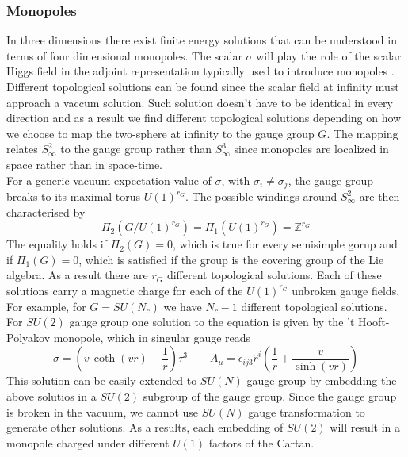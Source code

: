 \subsubsection{Monopoles}
In three dimensions there exist finite energy solutions that can be understood in terms of four dimensional monopoles.
The scalar $\sigma$ will play the role of the scalar Higgs field in the adjoint representation typically used to introduce monopoles \cite{Weinberg:2006rq}.
Different topological solutions can be found since the scalar field at infinity must approach a vaccum solution.
Such solution doesn't have to be identical in every direction and as a result we find different topological solutions depending on how we choose to map the two-sphere at infinity to the gauge group $G$.
The mapping relates $S^2_{\infty}$ to the gauge group rather than $S^3_{\infty}$ since monopoles are localized in space rather than in space-time.\\
For a generic vacuum expectation value of $\sigma$, with $\sigma_i \neq \sigma_j$, the gauge group breaks to its maximal torus $U(1)^{r_G}$.
The possible windings around $S^2_{\infty}$ are then characterised by
\begin{equation}
 \Pi_{2} \left( G / U(1)^{r_G} \right) = \Pi_1 (U(1)^{r_G}) = \mathbb{Z}^{r_G}
\end{equation}
The equality holds if $\Pi_2(G) = 0$, which is true for every semisimple gorup and if $\Pi_1(G) = 0$, which is satisfied if the group is the covering group of the Lie algebra.
As a result there are $r_G$ different topological solutions.
Each of these solutions carry a magnetic charge for each of the $U(1)^{r_G}$ unbroken gauge fields. 
For example, for $G= SU(N_c)$ we have $N_c-1$ different topological solutions.
\\
For $SU(2)$ gauge group one solution to the equation is given by the 't Hooft-Polyakov monopole, which in singular gauge reads
\begin{equation}
  \sigma = \left( v \, \coth (v r) - \frac{1}{r} \right)  \tau^3 \qquad A_{\mu} = \epsilon_{i j 3} \hat{r}^i \left( \frac{1}{r} + \frac{v}{\sinh (vr)} \right)
\end{equation}
This solution can be easily extended to $SU(N)$ gauge group by embedding the above solutios in a $SU(2)$ subgroup of the gauge group.
Since the gauge group is broken in the vacuum, we cannot use $SU(N)$ gauge transformation to generate other solutions.
As a results, each embedding of $SU(2)$ will result in a monopole charged under different $U(1)$ factors of the Cartan. 
